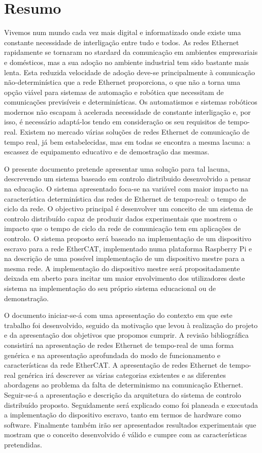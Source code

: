 \chapter*{Resumo}
Vivemos num mundo cada vez mais digital e informatizado onde existe uma constante necessidade de interligação entre tudo e todos.
As redes Ethernet rapidamente se tornaram no stardard da comunicação em ambientes empresariais e domésticos, mas a sua adoção no ambiente industrial tem sido bastante mais lenta.
Esta reduzida velocidade de adoção deve-se principalmente à comunicação não-determinística que a rede Ethernet proporciona, o que não a torna uma opção viável para sistemas de automação e robótica que necessitam de comunicações previsíveis e determinísticas.
Os automatismos e sistemas robóticos modernos não escapam à acelerada necessidade de constante interligação e, por isso, é necessário adaptá-los tendo em consideração os seu requisitos de tempo-real.
Existem no mercado várias soluções de redes Ethernet de comunicação de tempo real, já bem estabelecidas, mas em todas se encontra a mesma lacuna: a escassez de equipamento educativo e de demostração das mesmas.

O presente documento pretende apresentar uma solução para tal lacuna, descrevendo um sistema baseado em controlo distribuido desenvolvido a pensar na educação.
O sistema apresentado foca-se na variável com maior impacto na característica determinística das redes de Ethernet de tempo-real: o tempo de ciclo da rede.
O objectivo principal é desenvolver um conceito de um sistema de controlo distribuído capaz de produzir dados experimentais que mostrem o impacto que o tempo de ciclo da rede de comunicação tem em aplicações de controlo.
O sistema proposto será baseado na implementação de um dispositivo escravo para a rede EtherCAT, implementado numa plataforma Raspberry Pi e na descrição de uma possível implementação de um dispositivo mestre para a mesma rede.
A implementação do dispositivo mestre será propositadamente deixada em aberto para incitar um maior envolvimento dos utilizadores deste sistema na implementação do seu próprio sistema educacional ou de demonstração.

O documento iniciar-se-á com uma apresentação do contexto em que este trabalho foi desenvolvido, seguido da motivação que levou à realização do projeto e da apresentação dos objetivos que propomos cumprir.
A revisão bibliográfica consistirá na apresentação de redes Ethernet de tempo-real de uma forma genérica e na apresentação aprofundada do modo de funcionamento e características da rede EtherCAT.
A apresentação de redes Ethernet de tempo-real genérica irá descrever as várias categorias existentes e as diferentes abordagens ao problema da falta de determinismo na comunicação Ethernet.
Seguir-se-á a apresentação e descrição da arquitetura do sistema de controlo distribuído proposto.
Seguidamente será explicado como foi planeada e executada a implementação do dispositivo escravo, tanto em termos de hardware como software.
Finalmente também irão ser apresentados resultados experimentais que mostram que o conceito desenvolvido é válido e cumpre com as características pretendidas.

